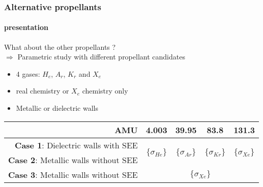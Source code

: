 \documentclass[sans, aspectratio=169]{beamer}
\begin{document}
\begin{frame} 
	\frametitle{Alternative propellants} 
	\framesubtitle{presentation} 
		What about the other propellants ?\\
		$\Rightarrow$ Parametric study with different propellant candidates
		
		\begin{itemize}
     		\item 4 gases: $H_e$, $A_r$, $K_r$ and $X_e$
			\item real chemistry or $X_e$ chemistry only
			\item Metallic or dielectric walls
		\end{itemize}
			
		\begin{table}%
   		\centering
	\begin{tabular}{| r | c c c c |}
\hline
 AMU     &   4.003           & 39.95             &    83.8           &    131.3          \\ \hline
{\bf Case 1}: Dielectric walls with SEE \:   & \multirow{2}{*}{ $\{\sigma_{He}\}$} & \multirow{2}{*}{$\{\sigma_{Ar}\}$}  & \multirow{2}{*}{$\{\sigma_{Kr}\}$}  & \multirow{2}{*}{$\{\sigma_{Xe}\}$}   \\
{\bf Case 2}: Metallic walls without SEE &   &   &   &   \\
{\bf Case 3}: Metallic walls without SEE &  &\multicolumn{2}{c}{$\{\sigma_{Xe}\}$}  &  \\ \hline
\end{tabular}

\end{table}
		
\end{frame}






%
%		
%		
%		
\end{document}
